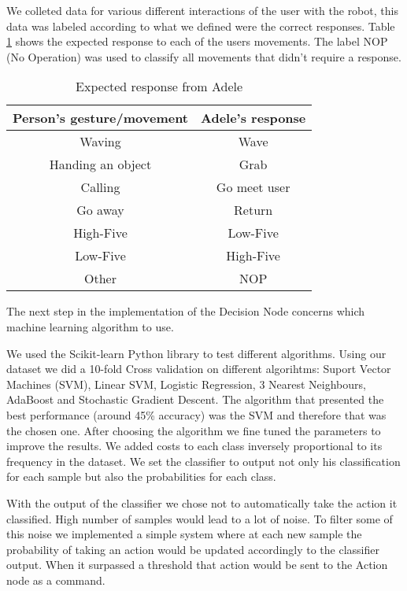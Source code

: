 We colleted data for various different interactions of the user with the robot, this data was labeled according to what we defined were the correct responses. Table \ref{tab:expected_response} shows the expected response to each of the users movements. The label NOP (No Operation) was used to classify all movements that didn't require a response.

\begin{table}[!h]
\centering
\caption{Expected response from Adele}
\label{tab:expected_response}
\begin{tabular}{|c|c|}
\hline
\textbf{Person's gesture/movement} & \textbf{Adele's response} \\ \hline
Waving                           & Wave                                 \\
Handing an object                & Grab                            		\\
Calling                          & Go meet user                         \\
Go away                          & Return                       \\
High-Five                        & Low-Five                             \\
Low-Five                         & High-Five                            \\
Other	                           & NOP                                  \\ \hline
\end{tabular}
\end{table}

The next step in the implementation of the Decision Node concerns which machine learning algorithm to use. 

We used the Scikit-learn Python library \cite{Scikit-Learn} to test different algorithms. Using our dataset we did a 10-fold Cross validation on different algorihtms: Suport Vector Machines (SVM), Linear SVM, Logistic Regression, 3 Nearest Neighbours, AdaBoost and Stochastic Gradient Descent. The algorithm that presented the best performance (around 45\% accuracy) was the SVM and therefore that was the chosen one. After choosing the algorithm we fine tuned the parameters to improve the results. We added costs to each class inversely proportional to its frequency in the dataset. We set the classifier to output not only his classification for each sample but also the probabilities for each class.

With the output of the classifier we chose not to automatically take the action it classified. High number of samples would lead to a lot of noise. To filter some of this noise we implemented a simple system where at each new sample the probability of taking an action would be updated accordingly to the classifier output. When it surpassed a threshold that action would be sent to the Action node as a command.


